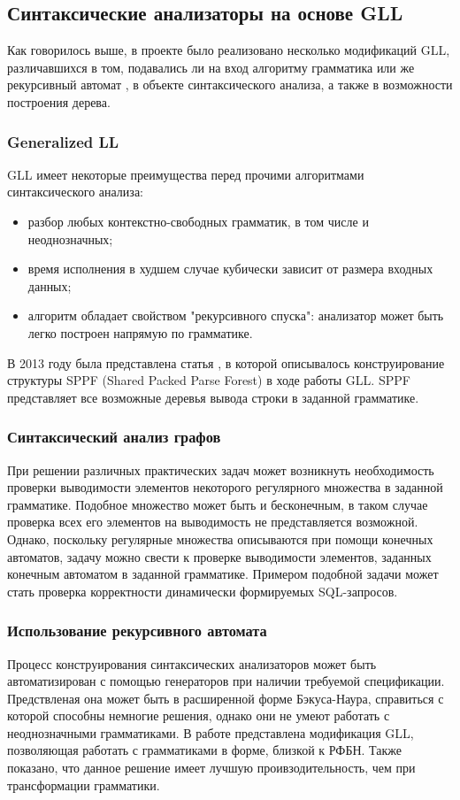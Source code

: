 \documentclass[14pt]{matmex-diploma}
\begin{document}
\subsection{Синтаксические анализаторы на основе GLL}
Как говорилось выше, в проекте было реализовано несколько модификаций GLL, различавшихся в том, подавались ли на вход алгоритму грамматика или же рекурсивный автомат \cite{RADesc}, в объекте синтаксического анализа, а также в возможности построения дерева.

\subsubsection{Generalized LL}
GLL имеет некоторые преимущества перед прочими алгоритмами синтаксического анализа:
\begin{itemize}
    \item разбор любых контекстно-свободных грамматик, в том числе и неоднозначных;
    \item время исполнения в худшем случае кубически зависит от размера входных данных;
    \item алгоритм обладает свойством "рекурсивного спуска": анализатор может быть легко построен напрямую по грамматике.
\end{itemize}
В 2013 году была представлена статья \cite{GLLTreeGen}, в которой описывалось конструирование структуры SPPF (Shared Packed Parse Forest) в ходе работы GLL. SPPF представляет все возможные деревья вывода строки в заданной грамматике.

\subsubsection{Синтаксический анализ графов}
При решении различных практических задач может возникнуть необходимость проверки выводимости элементов некоторого регулярного множества в заданной грамматике. Подобное множество может быть и бесконечным, в таком случае проверка всех его элементов на выводимость не представляется возможной. Однако, поскольку регулярные множества описываются при помощи конечных автоматов, задачу можно свести к проверке выводимости элементов, заданных конечным автоматом в заданной грамматике. Примером подобной задачи может стать проверка корректности динамически формируемых SQL-запросов.

\subsubsection{Использование рекурсивного автомата}
\label{subsec:ra}
Процесс конструирования синтаксических анализаторов может быть автоматизирован с помощью генераторов при наличии требуемой спецификации. Предствленая она может быть в расширенной форме Бэкуса-Наура, справиться с которой способны немногие решения, однако они не умеют работать с неоднозначными грамматиками. В работе \cite{paperFSA} представлена модификация GLL, позволяющая работать с грамматиками в форме, близкой к РФБН. Также показано, что данное решение имеет лучшую проивзодительность, чем при трансформации грамматики.
\end{document}
